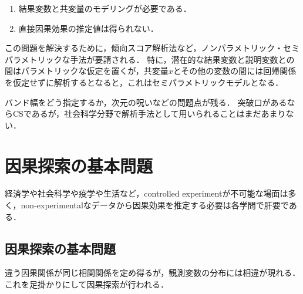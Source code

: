 \documentclass[uplatex,dvipdfmx]{jsreport}
\begin{document}
\begin{problem}\mbox{}
    \begin{enumerate}
        \item 結果変数と共変量のモデリングが必要である．
        \item 直接因果効果の推定値は得られない．
    \end{enumerate}
\end{problem}

この問題を解決するために，傾向スコア解析法など，ノンパラメトリック・セミパラメトリックな手法が要請される．
特に，潜在的な結果変数と説明変数との間はパラメトリックな仮定を置くが，共変量$x$とその他の変数の間には回帰関係を仮定せずに解析するとなると，これはセミパラメトリックモデルとなる．

\begin{example}
    バンド幅をどう指定するか，次元の呪いなどの問題点が残る．
    突破口があるならCSであるが，社会科学分野で解析手法として用いられることはまだあまりない．
\end{example}

\section{因果探索の基本問題}

\begin{tcolorbox}[colframe=ForestGreen, colback=ForestGreen!10!white,breakable,colbacktitle=ForestGreen!40!white,coltitle=black,fonttitle=\bfseries\sffamily,
title=]
    経済学や社会科学や疫学や生活など，controlled experimentが不可能な場面は多く，non-experimentalなデータから因果効果を推定する必要は各学問で肝要である．
\end{tcolorbox}

\subsection{因果探索の基本問題}

\begin{tcolorbox}[colframe=ForestGreen, colback=ForestGreen!10!white,breakable,colbacktitle=ForestGreen!40!white,coltitle=black,fonttitle=\bfseries\sffamily,
    title=]
        違う因果関係が同じ相関関係を定め得るが，観測変数の分布には相違が現れる．
        これを足掛かりにして因果探索が行われる．
\end{tcolorbox}
\end{document}
